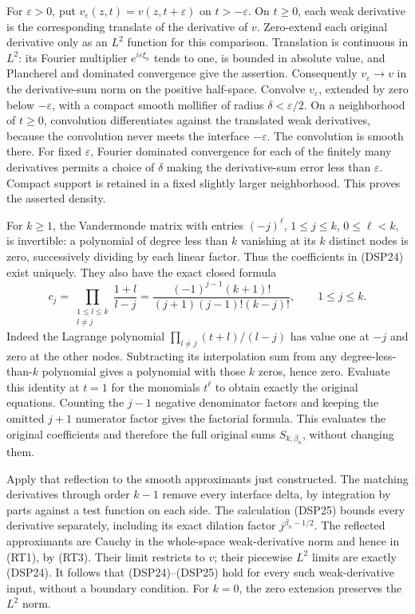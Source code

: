 \documentclass[
  11pt,
]{article}
\begin{document}
For \(\varepsilon>0\), put \(v_\varepsilon(z,t)=v(z,t+\varepsilon)\) on
\(t>-\varepsilon\). On \(t\geq0\), each weak derivative is the
corresponding translate of the derivative of \(v\). Zero-extend each
original derivative only as an \(L^2\) function for this comparison.
Translation is continuous in \(L^2\): its Fourier multiplier
\(e^{i\varepsilon\xi_n}\) tends to one, is bounded in absolute value,
and Plancherel and dominated convergence give the assertion.
Consequently \(v_\varepsilon\to v\) in the derivative-sum norm on the
positive half-space. Convolve \(v_\varepsilon\), extended by zero below
\(-\varepsilon\), with a compact smooth mollifier of radius
\(\delta<\varepsilon/2\). On a neighborhood of \(t\geq0\), convolution
differentiates against the translated weak derivatives, because the
convolution never meets the interface \(-\varepsilon\). The convolution
is smooth there. For fixed \(\varepsilon\), Fourier dominated
convergence for each of the finitely many derivatives permits a choice
of \(\delta\) making the derivative-sum error less than \(\varepsilon\).
Compact support is retained in a fixed slightly larger neighborhood.
This proves the asserted density.

For \(k\geq1\), the Vandermonde matrix with entries \((-j)^\ell\),
\(1\leq j\leq k\), \(0\leq\ell<k\), is invertible: a polynomial of
degree less than \(k\) vanishing at its \(k\) distinct nodes is zero,
successively dividing by each linear factor. Thus the coefficients in
(DSP24) exist uniquely. They also have the exact closed formula \[
 c_j=\prod_{\substack{1\leq l\leq k\\l\ne j}}\frac{1+l}{l-j}
 =\frac{(-1)^{j-1}(k+1)!}{(j+1)(j-1)!(k-j)!},\qquad1\leq j\leq k.
 \tag{DSP-ECJ}
\] Indeed the Lagrange polynomial \(\prod_{l\ne j}(t+l)/(l-j)\) has
value one at \(-j\) and zero at the other nodes. Subtracting its
interpolation sum from any degree-less-than-\(k\) polynomial gives a
polynomial with those \(k\) zeros, hence zero. Evaluate this identity at
\(t=1\) for the monomials \(t^\ell\) to obtain exactly the original
equations. Counting the \(j-1\) negative denominator factors and keeping
the omitted \(j+1\) numerator factor gives the factorial formula. This
evaluates the original coefficients and therefore the full original sums
\(S_{k,\beta_n}\), without changing them.

Apply that reflection to the smooth approximants just constructed. The
matching derivatives through order \(k-1\) remove every interface delta,
by integration by parts against a test function on each side. The
calculation (DSP25) bounds every derivative separately, including its
exact dilation factor \(j^{\beta_n-1/2}\). The reflected approximants
are Cauchy in the whole-space weak-derivative norm and hence in (RT1),
by (RT3). Their limit restricts to \(v\); their piecewise \(L^2\) limits
are exactly (DSP24). It follows that (DSP24)--(DSP25) hold for every
such weak-derivative input, without a boundary condition. For \(k=0\),
the zero extension preserves the \(L^2\) norm.
\end{document}
